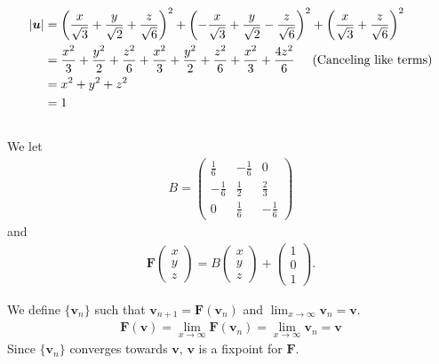 \documentclass[a4paper,10pt,english]{article}
\begin{document}
\begin{align*}
    |\bm{u}| &= 
    \left( 
        \frac{x}{\sqrt 3} + \frac{y}{\sqrt 2} + \frac{z}{\sqrt6}
    \right)^2
    + \left( 
        - \frac{x}{\sqrt 3} + \frac{y}{\sqrt 2} - \frac{z}{\sqrt6}
    \right)^2
    + \left( 
        \frac{x}{\sqrt 3} + \frac{z}{\sqrt6}
    \right)^2 \\
    &= \frac{x^2}{3} + \frac{y^2}{2} + \frac{z^2}{6}
    + \frac{x^2}{3} + \frac{y^2}{2} + \frac{z^2}{6}
    + \frac{x^2}{3} + \frac{4z^2}{6} 
    \hspace{0.5cm} \text{(Canceling like terms)}\\
    &= x^2 + y^2 + z^2 \\
    &= 1
\end{align*}

\subsection{} \label{2b}

We let
\begin{align}
    B = 
    \begin{pmatrix}
        \frac{1}{6} & - \frac{1}{6} & 0 \\
        - \frac{1}{6} & \frac{1}{2} & \frac{2}{3} \\
        0 & \frac{1}{6} & - \frac{1}{6}
    \end{pmatrix}
\end{align}
and
\begin{align}
    \bm{F} \begin{pmatrix}
        x \\ y \\ z
    \end{pmatrix}
    = B
    \begin{pmatrix}
        x \\ y \\ z
    \end{pmatrix}
    + \begin{pmatrix}
        1 \\ 0 \\ 1
    \end{pmatrix}.
\end{align}

We define $\{ \bm{v}_n \}$ such that $\bm{v}_{n+1} = \bm{F}(\bm{v}_n)$ and $\lim_{x \to \infty} \bm{v}_n = \bm{v}$. 
\begin{align*}
    \bm{F}(\bm{v}) = \lim_{x \to \infty} \bm{F}(\bm{v}_n) 
    = \lim_{x \to \infty} \bm{v}_n = \bm{v}
\end{align*}
Since $\{ \bm{v}_n \}$ converges towards $\bm{v}$, $\bm{v}$ is a fixpoint for $\bm{F}$.
\end{document}

